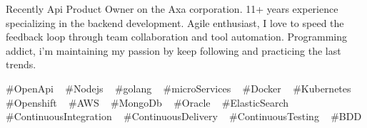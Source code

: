 

\begin{cvparagraph}

Recently Api Product Owner on the Axa corporation. 11+ years experience specializing in the backend development. Agile enthusiast, I love to speed the feedback loop through team collaboration and tool automation. Programming addict, i'm maintaining my passion by keep following and practicing the last trends.
\end{cvparagraph}
\begin{cvtechnologies}
 \#OpenApi ~
 \#Nodejs ~
 \#golang ~
 \#microServices ~
 \#Docker ~
 \#Kubernetes ~
 \#Openshift ~
 \#AWS ~
 \#MongoDb ~
 \#Oracle ~
 \#ElasticSearch ~
 \#ContinuousIntegration ~
 \#ContinuousDelivery ~
 \#ContinuousTesting ~
 \#BDD 
\end{cvtechnologies}
